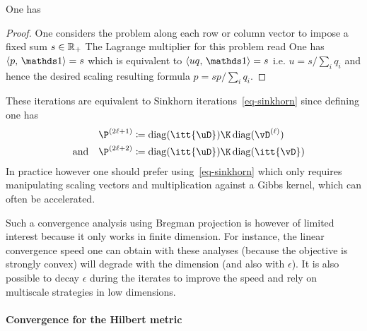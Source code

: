 \begin{prop}
One has 
\end{prop}
\begin{proof}
	One considers the problem along each row or column vector to impose a fixed sum $s \in \mathbb{R}_+$
	The Lagrange multiplier for this problem read
	One has $\dotp{p}{\ones} = s$ which is equivalent to $\dotp{uq}{\ones}=s$ i.e. $u=s/\sum_i q_i$ and hence the desired scaling resulting formula 
	$p=s p/\sum_i q_i$. 
\end{proof}

These iterations are equivalent to Sinkhorn iterations~\eqref{eq-sinkhorn} since defining 
\eq{\label{eq-sink-matrix}\P^{(2\ell)} \eqdef \diag(\it{\uD}) \K \diag(\it{\vD}),}
one has
\begin{align*}
	\P^{(2\ell+1)} &\eqdef \diag(\itt{\uD}) \K \diag(\it{\vD}) \\
	\qandq
	\P^{(2\ell+2)} &\eqdef \diag(\itt{\uD}) \K \diag(\itt{\vD})
\end{align*}
In practice however one should prefer using~\eqref{eq-sinkhorn} which only requires manipulating scaling vectors and multiplication against a Gibbs kernel, which can often be accelerated. 

Such a convergence analysis using Bregman projection is however of limited interest because it only works in finite dimension. For instance, the linear convergence speed one can obtain with these analyses (because the objective is strongly convex) will degrade with the dimension (and also with $\epsilon$). 
%
It is also possible to decay $\epsilon$ during the iterates to improve the speed and rely on multiscale strategies in low dimensions.
 



\paragraph{Convergence for the Hilbert metric}

